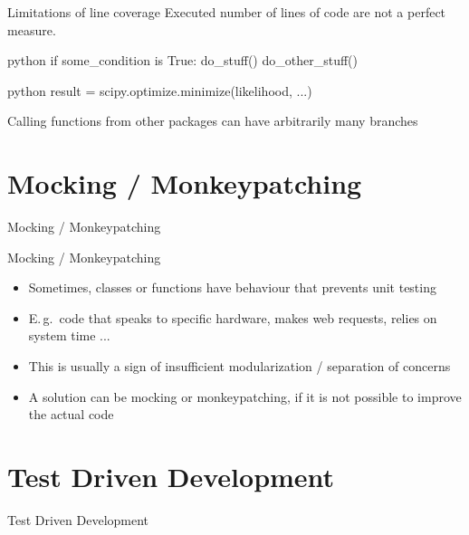 \documentclass[
  aspectratio=1610,
]{beamer}
\newcommand\headlineframe[1]{%
  \begin{frame}[c]%
    \begin{center}%
      \Huge\color{vertexDarkRed}#1%
    \end{center}%
  \end{frame}%
}%
\begin{document}
\begin{frame}[c, fragile]{Limitations of line coverage}
  Executed number of lines of code are not a perfect measure.
  \begin{code}{python}
    if some_condition is True:
        do_stuff()
    do_other_stuff()
  \end{code}



  \begin{code}{python}
    result = scipy.optimize.minimize(likelihood, ...)
  \end{code}

  Calling functions from other packages can have arbitrarily many branches
\end{frame}

\section{Mocking / Monkeypatching}
\headlineframe{Mocking / Monkeypatching}
\begin{frame}[c]{Mocking / Monkeypatching}
  \begin{itemize}
    \item Sometimes, classes or functions have behaviour that prevents unit testing
    \item E.\,g.\ code that speaks to specific hardware, makes web requests, relies on system time ...
    \item This is usually a sign of insufficient modularization / separation of concerns
    \item A solution can be mocking or monkeypatching, if it is not possible to improve the actual code
  \end{itemize}
\end{frame}

\section{Test Driven Development}
\headlineframe{Test Driven Development}
\end{document}
